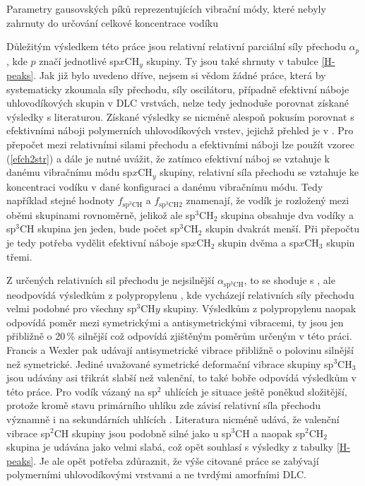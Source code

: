 \begin{table}[tbp]
 \centering
	\renewcommand{\tabcolsep}{1pt}
 
 \caption{Parametry gausovských píků reprezentujících vibrační módy, které nebyly zahrnuty do určování celkové koncentrace vodíku}
\label{H-peaks2}
\end{table}

Důležitým výsledkem této práce jsou relativní relativní parciální síly přechodu $\alpha_p$, kde $p$ značí jednotlivé sp$x$CH$_y$ skupiny. Ty jsou také shrnuty v tabulce \ref{H-peaks}. Jak již bylo uvedeno dříve, nejsem si vědom žádné práce, která by systematicky zkoumala síly přechodu, síly oscilátoru, případně efektivní náboje uhlovodíkových skupin v DLC vrstvách, nelze tedy jednoduše porovnat získané výsledky s literaturou. 
Získané výsledky se nicméně alespoň pokusím porovnat s efektivními náboji polymerních uhlovodíkových vrstev, jejichž přehled je v \cite{Heitz1998}. Pro přepočet mezi relativními silami přechodu a efektivními náboji lze použít vzorec (\ref{efch2str}) a dále je nutné uvážit, že zatímco efektivní náboj se vztahuje k danému vibračnímu módu sp$x$CH$_y$ skupiny, relativní síla přechodu se vztahuje ke koncentraci vodíku v dané konfiguraci a danému vibračnímu módu. 
Tedy například stejné hodnoty $f_\mathrm{sp^3CH}$ a $f_\mathrm{sp^3CH2}$ znamenají, že vodík je rozložený mezi oběmi skupinami rovnoměrně, jelikož ale sp$^3$CH$_2$ skupina obsahuje dva vodíky a sp$^3$CH skupina jen jeden, bude počet sp$^3$CH$_2$ skupin dvakrát menší. Při přepočtu je tedy potřeba vydělit efektivní náboje sp$x$CH$_2$ skupin dvěma a sp$x$CH$_3$ skupin třemi. 

Z určených relativních sil přechodu je nejsilnější $\alpha_\mathrm{sp^3CH}$, to se shoduje s \cite{Francis1950, Wexler1967}, ale neodpovídá výsledkům z polypropylenu \cite{Heitz1998}, kde vycházejí relativních síly přechodu velmi podobné pro všechny sp$^3$CH$y$ skupiny. Výsledkům z polypropylenu naopak odpovídá poměr mezi symetrickými a antisymetrickými vibracemi, ty jsou jen přibližně o 20\,\% silnější což odpovídá zjištěným poměrům určeným v této práci. Francis \cite{Francis1950} a Wexler \cite{Wexler1967} pak udávají antisymetrické vibrace přibližně o polovinu silnější než symetrické. Jediné uvažované symetrické deformační vibrace skupiny sp$^3$CH$_3$ jsou udávány asi třikrát slabší než valenční, to také bobře odpovídá výsledkům v této práce.  
Pro vodík vázaný na sp$^2$ uhlících je situace ještě poněkud složitější, protože kromě stavu primárního uhlíku zde závisí relativní síla přechodu významně i na sekundárních uhlících \cite{Heitz1998}. Literatura nicméně udává, že valenční vibrace sp$^2$CH skupiny jsou podobně silné jako u sp$^3$CH a naopak sp$^2$CH$_2$ skupina je udávána jako velmi slabá, což opět souhlasí s výsledky z tabulky \ref{H-peaks}. Je ale opět potřeba zdůraznit, že výše citované práce se zabývají polymerními uhlovodíkovými vrstvami a ne tvrdými amorfními DLC.   

